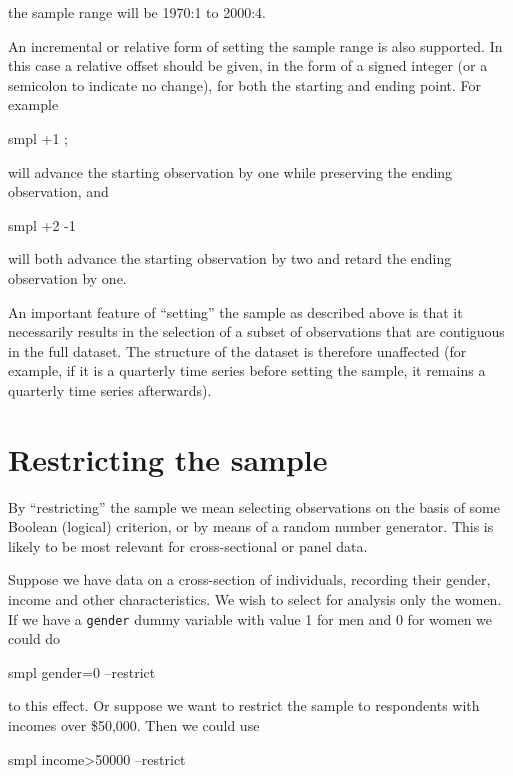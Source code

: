 the sample range will be 1970:1 to 2000:4.  

An incremental or relative form of setting the sample range is also
supported.  In this case a relative offset should be given, in the
form of a signed integer (or a semicolon to indicate no change), for
both the starting and ending point. For example

\begin{code}
    smpl +1 ;
\end{code}

will advance the starting observation by one while preserving the
ending observation, and

\begin{code}
    smpl +2 -1
\end{code}

will both advance the starting observation by two and retard the
ending observation by one.

An important feature of ``setting'' the sample as described above is
that it necessarily results in the selection of a subset of
observations that are contiguous in the full dataset. The structure of
the dataset is therefore unaffected (for example, if it is a quarterly
time series before setting the sample, it remains a quarterly time
series afterwards).

\section{Restricting the sample}
\label{sample-restrict}

By ``restricting'' the sample we mean selecting observations on the
basis of some Boolean (logical) criterion, or by means of a random
number generator.  This is likely to be most relevant for
cross-sectional or panel data.

Suppose we have data on a cross-section of individuals, recording
their gender, income and other characteristics.  We wish to select for
analysis only the women.  If we have a \verb+gender+ dummy variable
with value 1 for men and 0 for women we could do
%      
\begin{code}
    smpl gender=0 --restrict
\end{code}
%
to this effect.  Or suppose we want to restrict the sample to
respondents with incomes over \$50,000.  Then we could use
%
\begin{code}
    smpl income>50000 --restrict
\end{code}

